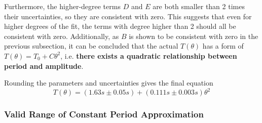 \documentclass[aps,twocolumn,secnumarabic,nobalancelastpage,amsmath,amssymb,nofootinbib,floatfix,letterpaper]{revtex4}
\begin{document}
Furthermore, the higher-degree terms \(D\) and \(E\) are both smaller than 2 times their uncertainties, so they are
consistent with zero. This suggests that even for higher degrees of the fit, the terms with degree
higher than 2 should all be consistent with zero. Additionally, as \(B\) is shown to be consistent with zero in the
previous subsection, it can be concluded that the actual \(T(\theta)\) has a form of \(T(\theta) = T_0 + C\theta^2\),
i.e. \textbf{there exists a quadratic relationship between period and amplitude}.

Rounding the parameters and uncertainties gives the final equation
\begin{equation}
    T(\theta) = (1.63\si{s} \pm 0.05\si{s}) + (0.111\si{s} \pm 0.003\si{s})\theta^2
\end{equation}

\subsubsection{Valid Range of Constant Period Approximation}
\label{sec:lab2_range}
\end{document}
